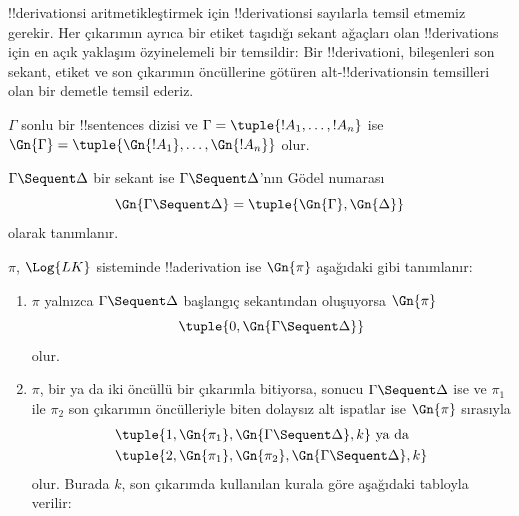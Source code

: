 


\begin{explain}
!!{derivation}s{}i aritmetikleştirmek için !!{derivation}s{}i sayılarla temsil
etmemiz gerekir. Her çıkarımın ayrıca bir etiket taşıdığı sekant ağaçları olan
!!{derivation}s için en açık yaklaşım özyinelemeli bir temsildir: Bir
!!{derivation}{}i, bileşenleri son sekant, etiket ve son çıkarımın öncüllerine
götüren alt-!!{derivation}s{}in temsilleri olan bir demetle temsil ederiz.
\end{explain}

\begin{defn}
$\Gamma$ sonlu bir !!{sentence}s dizisi ve $\Gamma =
\tuple{!A_1, \dots, !A_n}$ ise $\Gn{\Gamma} = \tuple{\Gn{!A_1},
  \dots, \Gn{!A_n}}$ olur.

$\Gamma \Sequent \Delta$ bir sekant ise $\Gamma \Sequent \Delta$'nın Gödel numarası
\[
\Gn{\Gamma \Sequent \Delta} = \tuple{\Gn{\Gamma}, \Gn{\Delta}}
\]
olarak tanımlanır.

$\pi$, $\Log{LK}$ sisteminde !!a{derivation} ise $\Gn{\pi}$ aşağıdaki gibi
tanımlanır:
\begin{enumerate}
\item $\pi$ yalnızca $\Gamma \Sequent \Delta$ başlangıç sekantından
  oluşuyorsa $\Gn{\pi}$
  \[
    \tuple{0, \Gn{\Gamma \Sequent \Delta}}
  \]
  olur.
\item $\pi$, bir ya da iki öncüllü bir çıkarımla bitiyorsa, sonucu
  $\Gamma \Sequent \Delta$ ise ve $\pi_1$ ile $\pi_2$ son çıkarımın
  öncülleriyle biten dolaysız alt ispatlar ise $\Gn{\pi}$ sırasıyla
  \begin{align*}
    & \tuple{1, \Gn{\pi_1}, \Gn{\Gamma \Sequent \Delta}, k} \text{ ya da}\\
    & \tuple{2, \Gn{\pi_1}, \Gn{\pi_2}, \Gn{\Gamma \Sequent \Delta}, k}
  \end{align*}
  olur. Burada $k$, son çıkarımda kullanılan kurala göre aşağıdaki tabloyla
  verilir:


\end{enumerate}
\end{defn}
